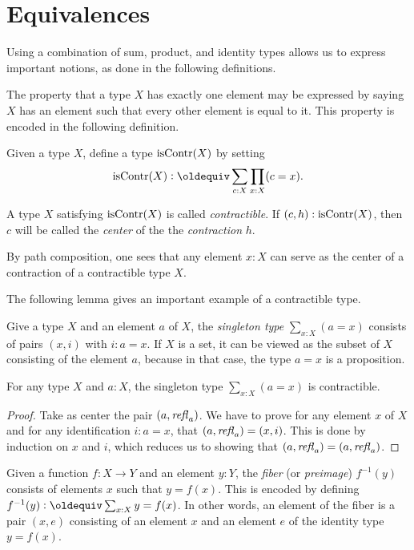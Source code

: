 \section{Equivalences}\label{sec:equivalence}

Using a combination of sum, product, and identity types allows
us to express important notions, as done in the following
definitions.

The property that a type $X$ has exactly one element may be expressed by saying $X$ has an element such that every other element is equal to it.
This property is encoded in the following definition.

\begin{definition}
  \label{def:contractible}
  Given a type $X$, define a type $\mathrm{isContr}(X)$ by setting
  $$\iscontr(X) \defeq \sum_{c:X} \prod_{x:X} (c=x).$$
\end{definition}

A type $X$ satisfying $\mathrm{isContr}(X)$ is called \emph{contractible}.  If $ (c,h) : \mathrm{isContr}(X) $, then $c$ will be called the {\em center} of the
the {\em contraction} $h$.

By path composition, one sees that any element $x : X$ can serve as the center of a contraction of a contractible type $X$.

The following lemma gives an important example of a contractible type.

Give a type $X$ and an element $a$ of $X$, 
the \emph{singleton type} $\sum_{x:X} (a=x)$
consists of pairs $(x,i)$ with $i: a=x$. If $X$ is a set, it 
can be viewed as the subset of $X$ consisting of the element $a$, because in that case, the
type $a=x$ is a proposition.

\begin{lemma}\label{lem:thepathspaceiscontractible}
For any type $X$ and $a:X$, the singleton type $\sum_{x:X} (a=x)$ is contractible.
\end{lemma}

\begin{proof}
Take as center the pair $(a,\mathop{{\it refl}_{a}})$. We have
to prove for any element $x$ of $X$ and for any identification
$i: a=x$, that $(a,\mathop{{\it refl}_{a}}) = (x,i)$.  This is done by induction on $x$ and $i$, which reduces us to showing
that $(a,\mathop{{\it refl}_{a}}) = (a,\mathop{{\it refl}_{a}})$.
\end{proof}

\begin{definition}
\label{def:fiber}
Given a function $f : X \to Y$ and an element $y:Y$, 
the \emph{fiber} (or \emph{preimage}) $f^{-1}(y)$ consists 
of elements $x$ such that $y = f(x)$.  
This is encoded by defining $f^{-1}(y) \defeq \sum_{x:X} y = f(x)$.  
In other words, an element of the fiber is a pair $(x,e)$ consisting
of an element $x$ and an element $e$ of the identity type $y = f(x)$.
\end{definition}

